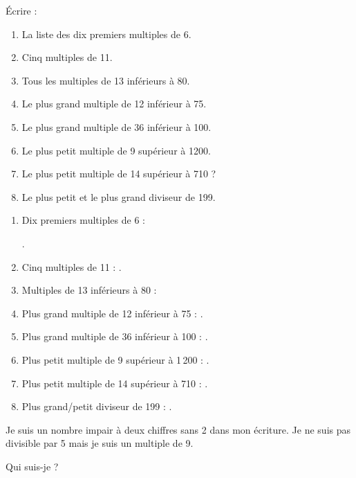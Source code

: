 \begin{Maquette}[Fiche,CorrigeFin,Colonnes=2]{}
\begin{multicols}{2}
      
      \begin{exercice} %
         Écrire :
         \begin{enumerate}
            \item La liste des dix premiers multiples de 6.
            \item Cinq multiples de 11.
            \item Tous les multiples de 13 inférieurs à 80.
            \item Le plus grand multiple de 12 inférieur à 75.
            \item Le plus grand multiple de 36 inférieur à 100.
            \item Le plus petit multiple de 9 supérieur à \num{1200}.
            \item Le plus petit multiple de 14 supérieur à 710 ?
            \item Le plus petit et le plus grand diviseur de 199.
         \end{enumerate}
      \end{exercice}

      \begin{Solution}
         \begin{enumerate}
            \item Dix premiers multiples de 6 : \par
               .
            \item Cinq multiples de 11 : .
            \item Multiples de 13 inférieurs à 80 : 
            \item Plus grand multiple de 12 inférieur à 75 : .
            \item Plus grand multiple de 36 inférieur à 100 : .
            \item Plus petit multiple de 9 supérieur à 1\,200 : .
            \item Plus petit multiple de 14 supérieur à 710 : .
            \item Plus grand/petit diviseur de 199 : .
         \end{enumerate}
      \end{Solution}
      
      
      \begin{exercice}[Dur] %
         Je suis un nombre impair à deux chiffres sans 2 dans mon écriture. Je ne suis pas divisible par 5 mais je suis un multiple de 9. \par
         Qui suis-je ? 
      \end{exercice}


\end{multicols}
\end{Maquette}
